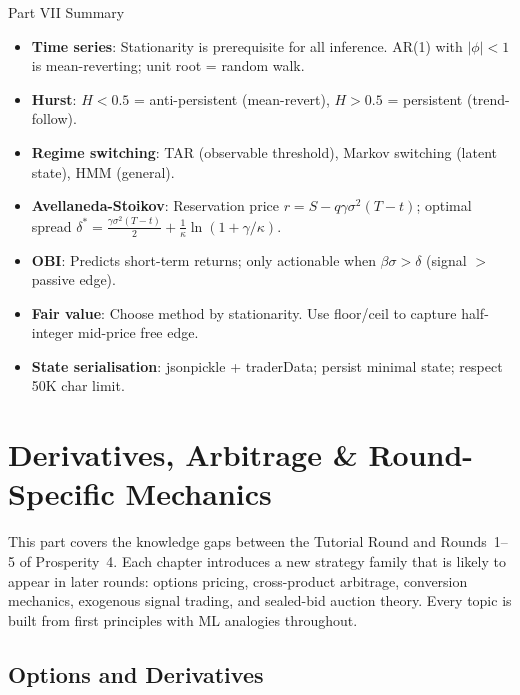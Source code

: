 \documentclass[12pt,a4paper,openany]{report}
\theoremstyle{definition}
\begin{document}
\begin{takeawaybox}{Part VII Summary}
\begin{itemize}
  \item \textbf{Time series}: Stationarity is prerequisite for all inference. AR(1) with $|\phi|<1$ is mean-reverting; unit root = random walk.
  \item \textbf{Hurst}: $H<0.5$ = anti-persistent (mean-revert), $H>0.5$ = persistent (trend-follow).
  \item \textbf{Regime switching}: TAR (observable threshold), Markov switching (latent state), HMM (general).
  \item \textbf{Avellaneda-Stoikov}: Reservation price $r = S - q\gamma\sigma^2(T-t)$; optimal spread $\delta^* = \frac{\gamma\sigma^2(T-t)}{2} + \frac{1}{\kappa}\ln(1+\gamma/\kappa)$.
  \item \textbf{OBI}: Predicts short-term returns; only actionable when $\beta\sigma > \delta$ (signal $>$ passive edge).
  \item \textbf{Fair value}: Choose method by stationarity. Use floor/ceil to capture half-integer mid-price free edge.
  \item \textbf{State serialisation}: jsonpickle + traderData; persist minimal state; respect 50K char limit.
\end{itemize}
\end{takeawaybox}


%
%
\part{Derivatives, Arbitrage \& Round-Specific Mechanics}

This part covers the knowledge gaps between the Tutorial Round and Rounds~1–5 of Prosperity~4. Each chapter introduces a new strategy family that is likely to appear in later rounds: options pricing, cross-product arbitrage, conversion mechanics, exogenous signal trading, and sealed-bid auction theory. Every topic is built from first principles with ML analogies throughout.


\chapter{Options and Derivatives}
\end{document}
